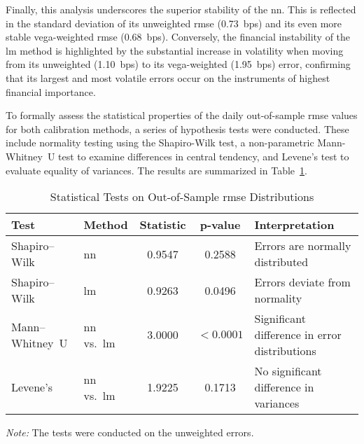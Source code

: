 Finally, this analysis underscores the superior stability of the \ac{nn}. This is reflected in the standard deviation of its unweighted \ac{rmse} (0.73~\ac{bps}) and its even more stable vega-weighted \ac{rmse} (0.68~\ac{bps}). Conversely, the financial instability of the \ac{lm} method is highlighted by the substantial increase in volatility when moving from its unweighted (1.10~\ac{bps}) to its vega-weighted (1.95~\ac{bps}) error, confirming that its largest and most volatile errors occur on the instruments of highest financial importance.

To formally assess the statistical properties of the daily out-of-sample \ac{rmse} values for both calibration methods, a series of hypothesis tests were conducted. These include normality testing using the Shapiro-Wilk test, a non-parametric Mann-Whitney~U test to examine differences in central tendency, and Levene's test to evaluate equality of variances. The results are summarized in Table~\ref{tab:stat_tests}.

\begin{table}[htbp]
	\centering
	\begin{threeparttable}
		\caption{Statistical Tests on Out-of-Sample \ac{rmse} Distributions}
		\label{tab:stat_tests}
		\begin{tabular}{lp{2.5cm}ccp{3.5cm}}
			\toprule
			\textbf{Test}   & \textbf{Method}      & \textbf{Statistic} & \textbf{p-value} & \textbf{Interpretation}                       \\
			\midrule
			Shapiro--Wilk   & \ac{nn}              & 0.9547             & 0.2588           & Errors are normally distributed               \\
			Shapiro--Wilk   & \ac{lm}              & 0.9263             & 0.0496           & Errors deviate from normality                 \\
			Mann--Whitney~U & \ac{nn} vs.\ \ac{lm} & 3.0000             & $<0.0001$        & Significant difference in error distributions \\
			Levene's        & \ac{nn} vs.\ \ac{lm} & 1.9225             & 0.1713           & No significant difference in variances        \\
			\bottomrule
		\end{tabular}
		\begin{tablenotes}
			\footnotesize
			\item \textit{Note:} The tests were conducted on the unweighted errors.
		\end{tablenotes}
	\end{threeparttable}
\end{table}

